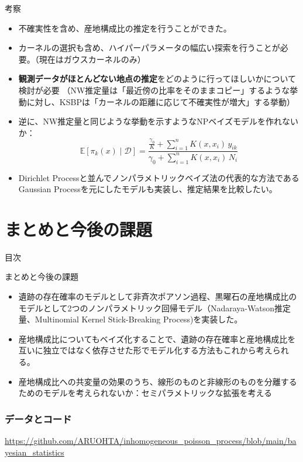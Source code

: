 \documentclass[xelatex, 8pt]{beamer}
\theoremstyle{plain}
\theoremstyle{definition}
\begin{document}
\begin{frame}{考察}

\begin{itemize}
    \item 不確実性を含め、産地構成比の推定を行うことができた。
    \item カーネルの選択も含め、ハイパーパラメータの幅広い探索を行うことが必要。（現在はガウスカーネルのみ）
    \item \textbf{観測データがほとんどない地点の推定}をどのように行ってほしいかについて検討が必要
    （NW推定量は「最近傍の比率をそのままコピー」するような挙動に対し、KSBPは「カーネルの距離に応じて不確実性が増大」する挙動）
    \item 逆に、NW推定量と同じような挙動を示すようなNPベイズモデルを作れないか：
    $$\mathbb{E}[\pi_k(x) \mid \mathcal{D}] =
\frac{ \frac{\gamma_0}{K} + \sum_{i=1}^n K(x, x_i)\, y_{ik} }{ \gamma_0 + \sum_{i=1}^n K(x, x_i)\, N_i }$$
    \item Dirichlet Processと並んでノンパラメトリックベイズ法の代表的な方法であるGaussian Processを元にしたモデルも実装し、推定結果を比較したい。

\end{itemize}

\end{frame}



\section{まとめと今後の課題}

\begin{frame}
{\Large 目次}
 \tableofcontents[currentsection]
\end{frame}

\begin{frame}{まとめと今後の課題}
\begin{itemize}
    \item 遺跡の存在確率のモデルとして非斉次ポアソン過程、黒曜石の産地構成比のモデルとして2つのノンパラメトリック回帰モデル（Nadaraya-Watson推定量、Multinomial Kernel Stick-Breaking Process)を実装した。
    \item 産地構成比についてもベイズ化することで、遺跡の存在確率と産地構成比を互いに独立ではなく依存させた形でモデル化する方法もこれから考えられる。
    \item 産地構成比への共変量の効果のうち、線形のものと非線形のものを分離するためのモデルを考えられないか：セミパラメトリックな拡張を考える

\end{itemize}

\end{frame}


\begin{frame}
\frametitle{データとコード}

\url{https://github.com/ARUOHTA/inhomogeneous_poisson_process/blob/main/bayesian_statistics}

\end{frame}


\end{document}

